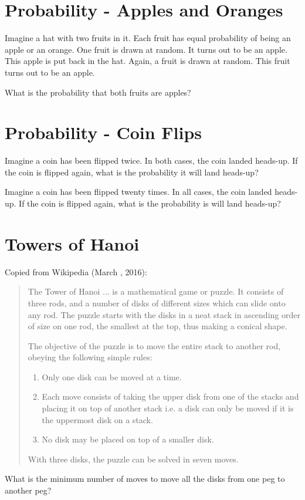 \documentclass[letterpaper, 11pt]{report}
\numberwithin{equation}{section}
\begin{document}
			
		\section{Probability - Apples and Oranges}
			
			
			Imagine a hat with two fruits in it.
			Each fruit has equal probability of being an apple or an orange.
			One fruit is drawn at random.
			It turns out to be an apple.
			This apple is put back in the hat.
			Again, a fruit is drawn at random.
			This fruit turns out to be an apple.
			
			What is the probability that both fruits are apples?
			
			
		\section{Probability - Coin Flips}
			
			
			Imagine a coin has been flipped twice.
			In both cases, the coin landed heads-up.
			If the coin is flipped again, what is the probability it will land heads-up?
			
			Imagine a coin has been flipped twenty times.
			In all cases, the coin landed heads-up.
			If the coin is flipped again, what is the probability is will land heads-up?
			
			
		\section{Towers of Hanoi}
			
			
			Copied from Wikipedia (March , 2016):
			\begin{quote}
				The Tower of Hanoi ... is a mathematical game or puzzle. It consists of three rods, and a number of disks of different sizes which can slide onto any rod. The puzzle starts with the disks in a neat stack in ascending order of size on one rod, the smallest at the top, thus making a conical shape.
				
				The objective of the puzzle is to move the entire stack to another rod, obeying the following simple rules:
				\begin{enumerate}
					\item Only one disk can be moved at a time.
					\item Each move consists of taking the upper disk from one of the stacks and placing it on top of another stack i.e. a disk can only be moved if it is the uppermost disk on a stack.
					\item No disk may be placed on top of a smaller disk.
				\end{enumerate}
				With three disks, the puzzle can be solved in seven moves.
			\end{quote}
			
			
			What is the minimum number of moves to move all the disks from one peg to another peg?
	
\end{document}
